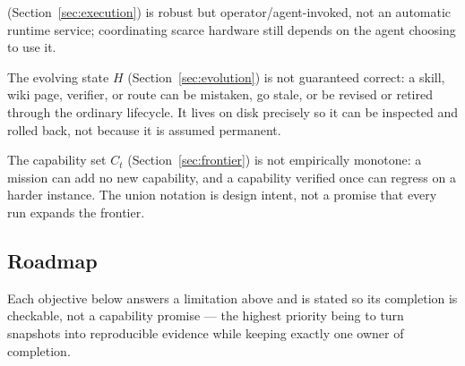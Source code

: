 \begin{description}[leftmargin=0em, itemsep=2pt]
    (Section~\ref{sec:execution}) is robust but operator/agent-invoked, not an automatic
    runtime service; coordinating scarce hardware still depends on the agent choosing to
    use it.
  \item[Runtime state can be wrong, stale, revised, or retired.] The evolving state
    $H$ (Section~\ref{sec:evolution}) is not guaranteed correct: a skill, wiki page,
    verifier, or route can be mistaken, go stale, or be revised or retired through the
    ordinary lifecycle. It lives on disk precisely so it can be inspected and rolled
    back, not because it is assumed permanent.
  \item[No guarantee of monotone capability expansion.] The capability set $C_t$
    (Section~\ref{sec:frontier}) is not empirically monotone: a mission can add no new
    capability, and a capability verified once can regress on a harder instance. The
    union notation is design intent, not a promise that every run expands the frontier.
\end{description}

\subsection{Roadmap}
\label{sec:roadmap}

Each objective below answers a limitation above and is stated so its completion is
checkable, not a capability promise --- the highest priority being to turn snapshots
into reproducible evidence while keeping exactly one owner of completion.

